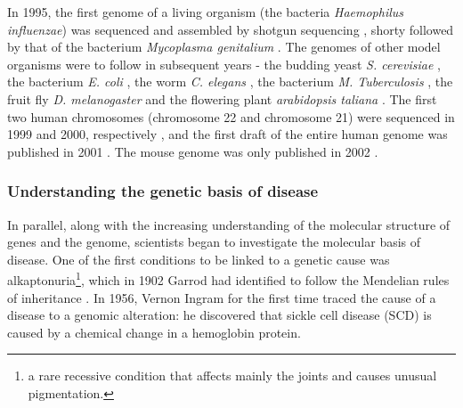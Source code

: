 


 
In 1995, the first genome of a living organism (the bacteria \textit{Haemophilus influenzae}) was sequenced and assembled by shotgun sequencing \cite{fleischmann1995whole}, shorty followed by that of the bacterium \textit{Mycoplasma genitalium} \cite{fraser1995minimal}. 
The genomes of other model organisms were to follow in subsequent years - the budding yeast \textit{S. cerevisiae} \cite{goffeau1996life}, the bacterium \textit{E. coli} \cite{blattner1997complete}, the worm \textit{C. elegans} \cite{c1998genome}, the bacterium \textit{M. Tuberculosis} \cite{cole1998deciphering}, the fruit fly \textit{D. melanogaster} \cite{adams2000genome} and the flowering plant \textit{arabidopsis taliana} \cite{kaul2000analysis}.
The first two human chromosomes (chromosome 22 and chromosome 21) were sequenced in 1999 and 2000, respectively \cite{dunham1999dna, hattori2000dna}, and the first draft of the entire human genome was published in 2001 \cite{lander2001initial, venter2001sequence}.
The mouse genome was only published in 2002 \cite{waterston2002initial}.

\subsubsection{Understanding the genetic basis of disease}

In parallel, along with the increasing understanding of the molecular structure of genes and the genome, scientists began to investigate the molecular basis of disease.
One of the first conditions to be linked to a genetic cause was alkaptonuria\footnote{a rare recessive condition that affects mainly the joints and causes unusual pigmentation.}, which in 1902 Garrod had identified  to follow the Mendelian rules of inheritance \cite{garrod1902incidence}.
In 1956, Vernon Ingram for the first time traced the cause of a disease to a genomic alteration: he discovered that sickle cell disease (SCD) is caused by a chemical change in a hemoglobin protein.
\\

